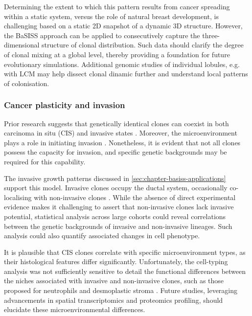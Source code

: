 Determining the extent to which this pattern results from cancer spreading within a static system, versus the role of natural breast development, is challenging based on a static 2D snapshot of a dynamic 3D structure. However, the \ac{BaSISS} approach can be applied to consecutively capture the three-dimensional structure of clonal distribution. Such data should clarify the degree of clonal mixing at a global level, thereby providing a foundation for future evolutionary simulations. Additional genomic studies of individual lobules, e.g. with \ac{LCM} may help dissect clonal dinamic further and understand local patterns of colonisation. 

\subsubsection*{Cancer plasticity and invasion}

Prior research suggests that genetically identical clones can coexist in both carcinoma in situ (\ac{CIS}) and invasive states \parencite{Casasent2018-gx}. Moreover, the microenvironment plays a role in initiating invasion \parencite{Sinha2021-mf,Risom2022-uw} . Nonetheless, it is evident that not all clones possess the capacity for invasion, and specific genetic backgrounds may be required for this capability.

The invasive growth patterns discussed in \cref{sec:chapter-basiss-applications} support this model. Invasive clones occupy the ductal system, occasionally co-localising with non-invasive clones . While the absence of direct experimental evidence makes it challenging to assert that non-invasive clones lack invasive potential, statistical analysis across large cohorts could reveal correlations between the genetic backgrounds of invasive and non-invasive lineages. Such analysis could also quantify associated changes in cell phenotype.

It is plausible that \ac{CIS} clones correlate with specific microenvironment types, as their histological features differ significantly. Unfortunately, the cell-typing analysis was not sufficiently sensitive to detail the functional differences between the niches associated with invasive and non-invasive clones, such as those proposed for neutrophils \parencite{Sinha2021-mf} and desmoplastic stroma \parencite{Risom2022-uw}. Future studies, leveraging advancements in spatial transcriptomics and proteomics profiling, should elucidate these microenvironmental differences.


